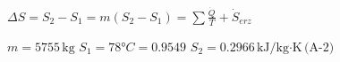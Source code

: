 \( \Delta S = S_2 - S_1 = m \left( S_2 - S_1 \right) = \sum \frac{\dot{Q}}{T} + \dot{S}_{erz} \)  

\( m = 5755 \, \text{kg} \)  
\( S_1 = 78°C = 0.9549 \)  
\( S_2 = 0.2966 \, \text{kJ/kg·K} \, \text{(A-2)} \)